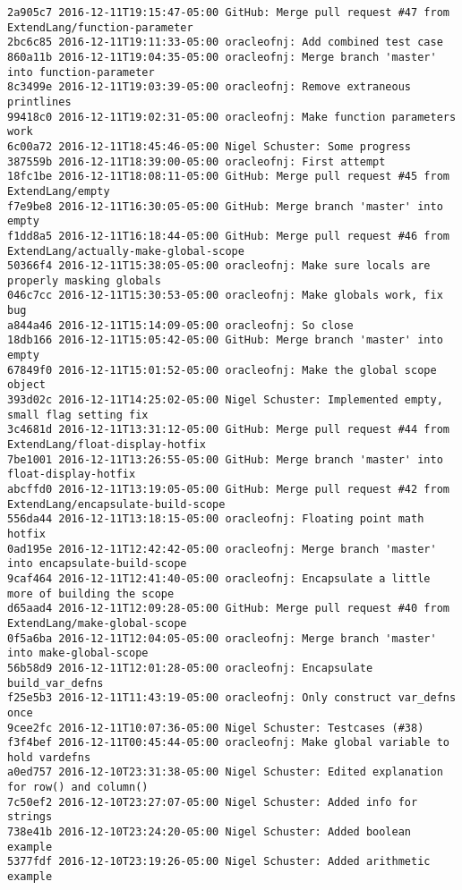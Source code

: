 \begin{lstlisting}
2a905c7 2016-12-11T19:15:47-05:00 GitHub: Merge pull request #47 from ExtendLang/function-parameter
2bc6c85 2016-12-11T19:11:33-05:00 oracleofnj: Add combined test case
860a11b 2016-12-11T19:04:35-05:00 oracleofnj: Merge branch 'master' into function-parameter
8c3499e 2016-12-11T19:03:39-05:00 oracleofnj: Remove extraneous printlines
99418c0 2016-12-11T19:02:31-05:00 oracleofnj: Make function parameters work
6c00a72 2016-12-11T18:45:46-05:00 Nigel Schuster: Some progress
387559b 2016-12-11T18:39:00-05:00 oracleofnj: First attempt
18fc1be 2016-12-11T18:08:11-05:00 GitHub: Merge pull request #45 from ExtendLang/empty
f7e9be8 2016-12-11T16:30:05-05:00 GitHub: Merge branch 'master' into empty
f1dd8a5 2016-12-11T16:18:44-05:00 GitHub: Merge pull request #46 from ExtendLang/actually-make-global-scope
50366f4 2016-12-11T15:38:05-05:00 oracleofnj: Make sure locals are properly masking globals
046c7cc 2016-12-11T15:30:53-05:00 oracleofnj: Make globals work, fix bug
a844a46 2016-12-11T15:14:09-05:00 oracleofnj: So close
18db166 2016-12-11T15:05:42-05:00 GitHub: Merge branch 'master' into empty
67849f0 2016-12-11T15:01:52-05:00 oracleofnj: Make the global scope object
393d02c 2016-12-11T14:25:02-05:00 Nigel Schuster: Implemented empty, small flag setting fix
3c4681d 2016-12-11T13:31:12-05:00 GitHub: Merge pull request #44 from ExtendLang/float-display-hotfix
7be1001 2016-12-11T13:26:55-05:00 GitHub: Merge branch 'master' into float-display-hotfix
abcffd0 2016-12-11T13:19:05-05:00 GitHub: Merge pull request #42 from ExtendLang/encapsulate-build-scope
556da44 2016-12-11T13:18:15-05:00 oracleofnj: Floating point math hotfix
0ad195e 2016-12-11T12:42:42-05:00 oracleofnj: Merge branch 'master' into encapsulate-build-scope
9caf464 2016-12-11T12:41:40-05:00 oracleofnj: Encapsulate a little more of building the scope
d65aad4 2016-12-11T12:09:28-05:00 GitHub: Merge pull request #40 from ExtendLang/make-global-scope
0f5a6ba 2016-12-11T12:04:05-05:00 oracleofnj: Merge branch 'master' into make-global-scope
56b58d9 2016-12-11T12:01:28-05:00 oracleofnj: Encapsulate build_var_defns
f25e5b3 2016-12-11T11:43:19-05:00 oracleofnj: Only construct var_defns once
9cee2fc 2016-12-11T10:07:36-05:00 Nigel Schuster: Testcases (#38)
f3f4bef 2016-12-11T00:45:44-05:00 oracleofnj: Make global variable to hold vardefns
a0ed757 2016-12-10T23:31:38-05:00 Nigel Schuster: Edited explanation for row() and column()
7c50ef2 2016-12-10T23:27:07-05:00 Nigel Schuster: Added info for strings
738e41b 2016-12-10T23:24:20-05:00 Nigel Schuster: Added boolean example
5377fdf 2016-12-10T23:19:26-05:00 Nigel Schuster: Added arithmetic example

\end{lstlisting}
